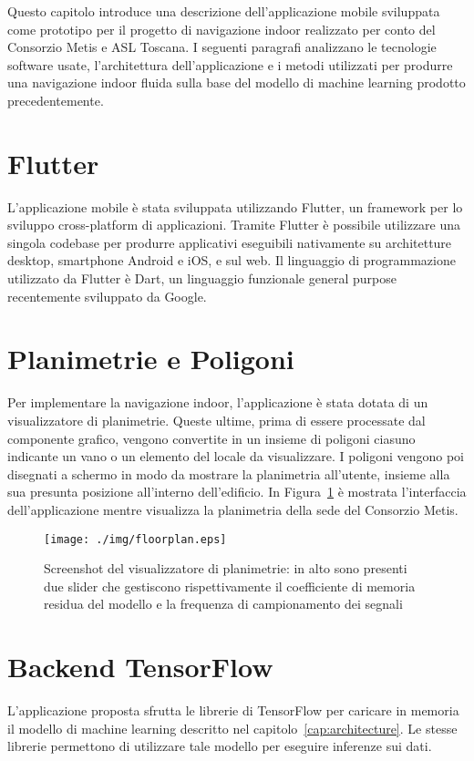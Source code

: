 
Questo capitolo introduce una descrizione dell'applicazione mobile sviluppata
come prototipo per il progetto di navigazione indoor realizzato per conto del
Consorzio Metis e ASL Toscana. I seguenti paragrafi analizzano le tecnologie
software usate, l'architettura dell'applicazione e i metodi utilizzati per
produrre una navigazione indoor fluida sulla base del modello di machine
learning prodotto precedentemente.
\section{Flutter}
L'applicazione mobile è stata sviluppata utilizzando 
Flutter\cite{flutter}, un framework per lo sviluppo cross-platform di
applicazioni. Tramite Flutter è possibile utilizzare una singola codebase per
produrre applicativi eseguibili nativamente su architetture desktop, smartphone
Android e iOS, e sul web. Il linguaggio di programmazione utilizzato da Flutter
è Dart, un linguaggio funzionale general purpose recentemente sviluppato da
Google.
\section{Planimetrie e Poligoni}
Per implementare la navigazione indoor, l'applicazione è stata dotata di un
visualizzatore di planimetrie. Queste ultime, prima di essere processate dal
componente grafico, vengono convertite in un insieme di poligoni ciasuno
indicante un vano o un elemento del locale da visualizzare. I poligoni vengono
poi disegnati a schermo in modo da mostrare la planimetria all'utente, insieme
alla sua presunta posizione all'interno dell'edificio. In
Figura~\ref{fig:floorplan} è mostrata l'interfaccia dell'applicazione mentre
visualizza la planimetria della sede del Consorzio Metis.
\begin{figure}[!htp]
  \centering\texttt{[image: ./img/floorplan.eps]}
  \caption{Screenshot del visualizzatore di planimetrie: in alto sono presenti
  due slider che gestiscono rispettivamente il coefficiente di memoria residua
del modello e la frequenza di campionamento dei segnali}%
  \label{fig:floorplan}%
\end{figure}
\section{Backend TensorFlow}
L'applicazione proposta sfrutta le librerie di TensorFlow per caricare in
memoria il modello di machine learning descritto nel
capitolo~\ref{cap:architecture}. Le stesse librerie permettono di utilizzare
tale modello per eseguire inferenze sui dati. 

